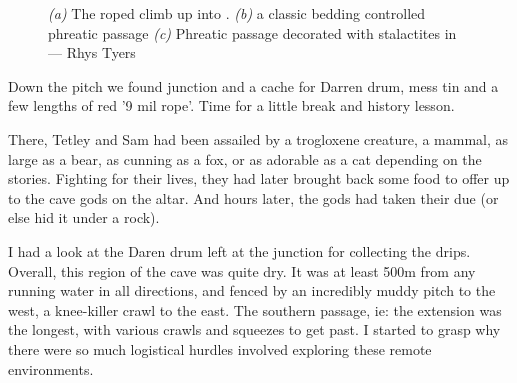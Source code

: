 \begin{figure}[t!]
\checkoddpage \ifoddpage \forcerectofloat \else \forceversofloat \fi
\centering
    \begin{subfigure}[t]{0.393\textwidth}
        \centering
        \caption{} \label{HelmsDeep}
    \end{subfigure}
        \hfill
\begin{subfigure}[t]{0.59\textwidth}
\centering
{}
 \caption{}\label{water chamber below helm's deep}
\end{subfigure}
    \vspace{0cm}
    \begin{subfigure}[t]{\textwidth}
    \centering
        \caption{} \label{Atlantis}
    \end{subfigure}
    \caption{
    \emph{(a)} The roped climb up into \protect{}.  
     \emph{(b)} \protect{} a classic bedding controlled phreatic passage
     \emph{(c)} Phreatic passage decorated with stalactites in \protect{} --- Rhys Tyers }
\end{figure}

Down the pitch we found  junction and a cache for Darren drum, mess tin and a few lengths of red '9 mil rope'. Time for a little break and history lesson. 

There, Tetley and Sam had been assailed by a trogloxene creature, a mammal, as large as a bear, as cunning as a fox, or as adorable as a cat depending on the stories. Fighting for their lives, they had later brought back some food to offer up to the cave gods on the  altar. And hours later, the gods had taken their due (or else hid it under a rock). 


I had a look at the Daren drum left at the junction for collecting the drips. Overall, this region of the cave was quite dry. It was at least 500m from any running water in all directions, and fenced by an incredibly muddy pitch to the west, a knee-killer crawl to the east. The southern passage, ie: the  extension was the longest, with various crawls and squeezes to get past. I started to grasp why there were so much logistical hurdles involved exploring these remote environments.

